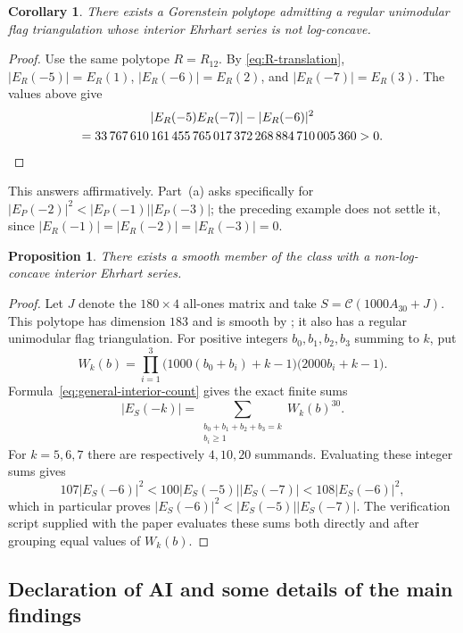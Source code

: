 \documentclass[11pt, letterpaper, english]{amsart}
\theoremstyle{teoremas}
\newtheorem{corollary}[theorem]{Corollary}
\newtheorem{proposition}[theorem]{Proposition}
\theoremstyle{definition}
\newcommand{\cC}{\mathcal C}
\begin{document}
\begin{corollary}\label{cor:interior}
There exists a Gorenstein polytope admitting a regular unimodular
flag triangulation whose interior Ehrhart series is not log-concave.
\end{corollary}
\begin{proof}
Use the same polytope $R=R_{12}$. By \eqref{eq:R-translation},
$|E_R(-5)|=E_R(1)$, $|E_R(-6)|=E_R(2)$, and $|E_R(-7)|=E_R(3)$.
The values above give
\begin{multline*}
 |E_R(-5)E_R(-7)|-|E_R(-6)|^2\\
 =33\,767\,610\,161\,455\,765\,017\,372\,268\,884\,710\,005\,360>0.\qedhere
\end{multline*}
\end{proof}

This answers \cite[Question~5.12(b)]{ferroni-higashitani}
affirmatively. Part~(a) asks specifically for
$|E_P(-2)|^2<|E_P(-1)||E_P(-3)|$; the preceding example does not settle it,
since $|E_R(-1)|=|E_R(-2)|=|E_R(-3)|=0$.

\begin{proposition}\label{prop:smooth-interior}
There exists a smooth member of the class with a non-log-concave
interior Ehrhart series.
\end{proposition}
\begin{proof}
Let $J$ denote the $180\times4$ all-ones matrix and take
$S=\cC(1000A_{30}+J)$. This polytope has dimension $183$ and is
smooth by ; it also has a regular unimodular flag
triangulation. For positive integers $b_0,b_1,b_2,b_3$ summing to $k$,
put
\[
 W_k(b)=\prod_{i=1}^3
       \bigl(1000(b_0+b_i)+k-1\bigr)
       \bigl(2000b_i+k-1\bigr).
\]
Formula~\eqref{eq:general-interior-count} gives the exact finite sums
\begin{equation}\label{eq:smooth-interior-certificate}
 |E_S(-k)|=\sum_{\substack{b_0+b_1+b_2+b_3=k\\b_i\ge1}}W_k(b)^{30}.
\end{equation}
For $k=5,6,7$ there are respectively $4,10,20$ summands. Evaluating
these integer sums gives
\[
 107|E_S(-6)|^2<100|E_S(-5)||E_S(-7)|<108|E_S(-6)|^2,
\]
which in particular proves $|E_S(-6)|^2<|E_S(-5)||E_S(-7)|$.
The verification script supplied with the paper evaluates these sums
both directly and after grouping equal values of $W_k(b)$.
\end{proof}

\subsection*{Declaration of AI and some details of the main findings}
\end{document}

